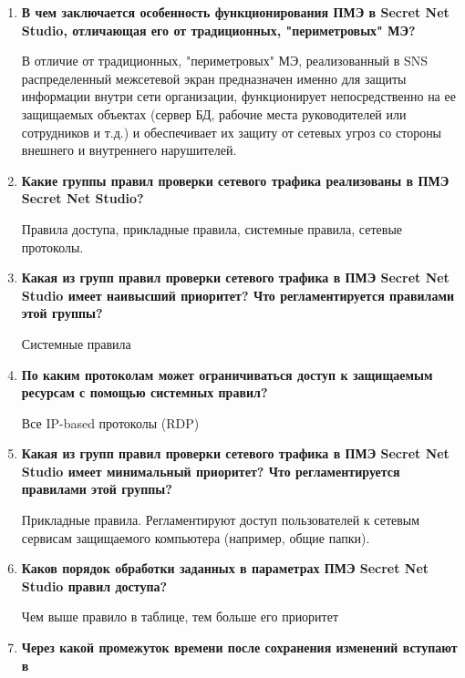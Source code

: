 \documentclass[a4paper,14pt]{extarticle}
\begin{document}
    \begin{enumerate}
        \singlespacing
        \item \textbf{В чем заключается особенность функционирования ПМЭ в Secret Net \linebreak Studio,
        отличающая его от традиционных, "периметровых" МЭ?}\par
        В отличие от традиционных, "периметровых" МЭ, реализованный в SNS \linebreak
        распределенный межсетевой экран предназначен именно для защиты \linebreak информации 
        внутри сети организации, функционирует непосредственно на ее защищаемых объектах 
        (сервер БД, рабочие места руководителей или сотрудников и т.д.) и обеспечивает 
        их защиту от сетевых угроз со стороны внешнего и внутреннего нарушителей.
        \item \textbf{Какие группы правил проверки сетевого трафика реализованы в ПМЭ Secret
        Net Studio?}\par
        Правила доступа, прикладные правила, системные правила, сетевые протоколы.
        \item \textbf{Какая из групп правил проверки сетевого трафика в ПМЭ Secret Net Studio
        имеет наивысший приоритет? Что регламентируется правилами этой \linebreak группы?}\par
        Системные правила
        \item \textbf{По каким протоколам может ограничиваться доступ к защищаемым \linebreak ресурсам
        с помощью системных правил?}\par
        Все IP-based протоколы (RDP)
        \item \textbf{Какая из групп правил проверки сетевого трафика в ПМЭ Secret Net Studio
        имеет минимальный приоритет? Что регламентируется правилами этой
        группы?}\par
        Прикладные правила. Регламентируют доступ пользователей к сетевым сервисам защищаемого компьютера (например, общие папки).
        \item \textbf{Каков порядок обработки заданных в параметрах ПМЭ Secret Net Studio
        правил доступа?}\par
        Чем выше правило в таблице, тем больше его приоритет
        \item \textbf{Через какой промежуток времени после сохранения изменений вступают в
}
\end{enumerate}
\end{document}
